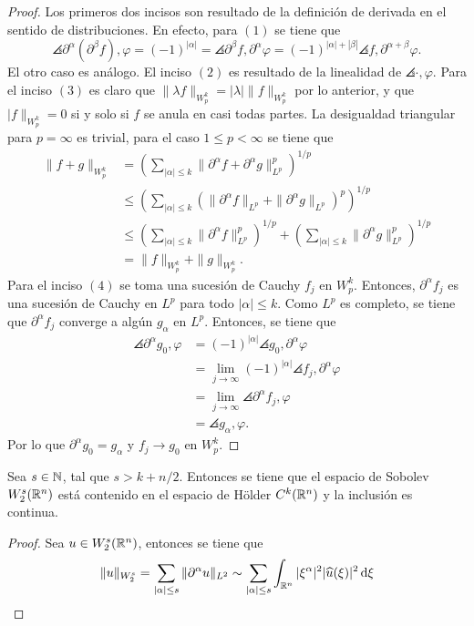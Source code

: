 \begin{proof}
	Los primeros dos incisos son resultado de la definición de derivada en el sentido de distribuciones. En efecto, para $(1)$ se tiene que 
	\begin{equation*}
		\angles{\partial^\alpha(\partial^\beta f), \varphi} = 
		(-1)^{|\alpha|} = \angles{\partial^\beta f, \partial^\alpha\varphi} =
		(-1)^{|\alpha| + |\beta|} \angles{f, \partial^{\alpha+\beta}\varphi}. 
	\end{equation*}
	El otro caso es análogo. El inciso $(2)$ es resultado de la linealidad de $\angles{\cdot, \varphi}$.  Para el inciso $(3)$ es claro que $\|\lambda f\|_{W^k_p} = |\lambda|\|f\|_{W^k_p}$ por lo anterior, y que $|f\|_{W^k_p} = 0$ si y solo si $f$ se anula en casi todas partes. La desigualdad triangular para $p=\infty$ es trivial, para el caso $1\leq p<\infty$ se tiene que 
	\begin{align*}
		\|f+g\|_{W^k_p} &= \left(\sum_{|\alpha|\leq k} \|\partial^\alpha f + \partial^\alpha g\|_{L^p}^p
		\right)^{1/p} \\ 
		& \leq \left(\sum_{|\alpha|\leq k} (\|\partial^\alpha f\|_{L^p} +  \|\partial^\alpha g\|_{L^p})^p
		\right)^{1/p} \\
		& \leq \left(\sum_{|\alpha|\leq k} \|\partial^\alpha f\|_{L^p}^p
		\right)^{1/p} + \left(\sum_{|\alpha|\leq k} \|\partial^\alpha g\|_{L^p}^p
		\right)^{1/p} \\
		& = \|f\|_{W^k_p} + \|g\|_{W^k_p}.
	\end{align*}
	Para el inciso $(4)$ se toma una sucesión de Cauchy $f_j$ en $W^k_p$. Entonces, $\partial^\alpha f_j$ es una sucesión de Cauchy en $L^p$ para todo $|\alpha|\leq k$. Como $L^p$ es completo, se tiene que $\partial^\alpha f_j$ converge a algún $g_\alpha$ en $L^p$. Entonces, se tiene que
	\begin{align*}
		\angles{\partial^\alpha g_0, \varphi}& = (-1)^{|\alpha|}  \angles{g_0, \partial^\alpha \varphi} \\
		& = \lim_{j\rightarrow\infty}(-1)^{|\alpha|} \angles{f_j, \partial^\alpha \varphi} \\
		& =  \lim_{j\rightarrow\infty}\angles{\partial^\alpha f_j, \varphi} \\
		& = \angles{g_\alpha, \varphi}.
	\end{align*} 
	Por lo que $\partial^\alpha g_0 = g_\alpha$ y $f_j \rightarrow g_0$ en $W^k_p$.
\end{proof}
\begin{theorem}
	Sea $s\in\mathbb{N}$, tal que $s>k+n/2$. Entonces se tiene que el espacio de Sobolev $W^s_2(\mathbb{R}^n)$ está contenido en el espacio de H\"older $C^k(\mathbb{R}^n)$ y la inclusión es continua.
\end{theorem}
\begin{proof}
	Sea $u\in W^s_2(\mathbb{R}^n)$, entonces se tiene que 
	\begin{equation*}
		\|u\|_{W^s_2} = \sum_{|\alpha|\leq s} \|\partial^\alpha u\|_{L^2}  \sim  \sum_{|\alpha|\leq s} \int_{\mathbb{R}^n} |\xi^\alpha|^2|\widehat{u}(\xi)|^2 \mathop{}\!\mathrm{d} \xi 
	\end{equation*}
\end{proof}
